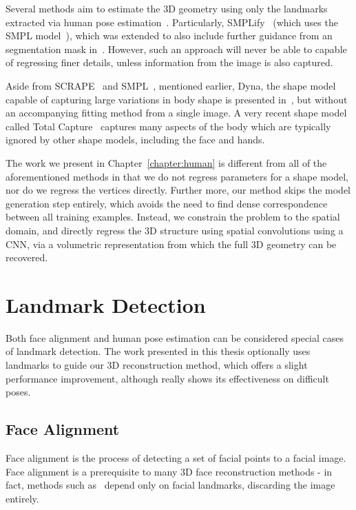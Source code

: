 Several methods aim to estimate the 3D geometry using only the
landmarks extracted via human pose
estimation~\cite{bogo2016smplify,ramakrishna2012reconstructing}. Particularly,
SMPLify~\cite{bogo2016smplify} (which uses the SMPL
model~\cite{loper2015smpl}), which was extended to also include
further guidance from an segmentation mask
in~\cite{varol2017learning}. However, such an approach will never be
able to capable of regressing finer details, unless information from
the image is also captured.

Aside from SCRAPE~\cite{anguelov2005scape} and
SMPL~\cite{loper2015smpl}, mentioned earlier, Dyna, the shape model
capable of capturing large variations in body shape is presented
in~\cite{Dyna:SIGGRAPH:2015}, but without an accompanying fitting
method from a single image. A very recent shape model called Total
Capture~\cite{Joo_2018_CVPR} captures many aspects of the body which
are typically ignored by other shape models, including the face and
hands.

The work we present in Chapter~\ref{chapter:human} is different from
all of the aforementioned methods in that we do not regress parameters
for a shape model, nor do we regress the vertices directly. Further
more, our method skips the model generation step entirely, which
avoids the need to find dense correspondence between all training
examples. Instead, we constrain the problem to the spatial domain, and
directly regress the 3D structure using spatial convolutions using a
CNN, via a volumetric representation from which the full 3D geometry
can be recovered.

\section{Landmark Detection}

Both face alignment and human pose estimation can be considered
special cases of landmark detection. The work presented in this thesis
optionally uses landmarks to guide our 3D reconstruction method, which
offers a slight performance improvement, although really shows its
effectiveness on difficult poses.

\subsection{Face Alignment}

Face alignment is the process of detecting a set of facial points to a
facial image. Face alignment is a prerequisite to many 3D face
reconstruction methods - in fact, methods such
as~\cite{huber2016multiresolution} depend only on facial landmarks,
discarding the image entirely.

